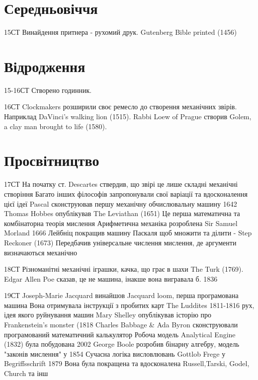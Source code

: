 \documentclass[12pt, letterpaper]{article}
\begin{document}
\section{Середньовіччя}
15СТ
Винайдення притнера - рухомий друк. Gutenberg Bible printed (1456)
\section{Відродження}
15-16СТ
Створено годинник.

16СТ
Clockmakers розширили своє ремесло до створення механічних звірів.
Наприклад DaVinci's walking lion (1515).
Rabbi Loew of Prague створив Golem, a clay man brought to life (1580).
\section{Просвітництво}
17СТ
На початку ст. Descartes ствердив, що звірі це лише складні механічні створіння
Багато інших філософів запропонували свої варіації та вдосконалення цієї ідеї
Pascal сконструював першу механічну обчислювальну машину 1642
Thomas Hobbes опублікував The Leviathan (1651)
Це перша математична та комбінаторна теорія мислення
Арифметична механіка розроблена Sir Samuel Morland 1666
Лейбніц покращив машину Паскаля щоб множити та ділити - Step Reckoner (1673)
Передбачив універсальне числення мислення, де аргументи визначаються механічно

18СТ
Різноманітні механічні іграшки, качка, що грає в шахи The Turk (1769).
Edgar Allen Poe  сказав, це не машина, інакше вона вигравала б. 1836

19СТ
Joseph-Marie Jacquard винайшов Jacquard loom, перша програмована машина
Вона отримувала інструкції з пробитих карт
The Luddites 1811-1816 рух, ідея якого руйнування машин
Mary Shelley опублікував історію про Frankenstein's monster (1818
Charles Babbage & Ada Byron сконструювали програмований математичний калькулятор
Робоча модель Analytical Engine (1832) була побудована 2002
George Boole розробив бінарну алгебру, модель "законів мислення" у 1854
Сучасна логіка висловлювань Gottlob Frege у Begriffsschrift 1879 
Вона була покращена та вдосконалена Russell,Tarski, Godel, Church та інш
\end{document}
